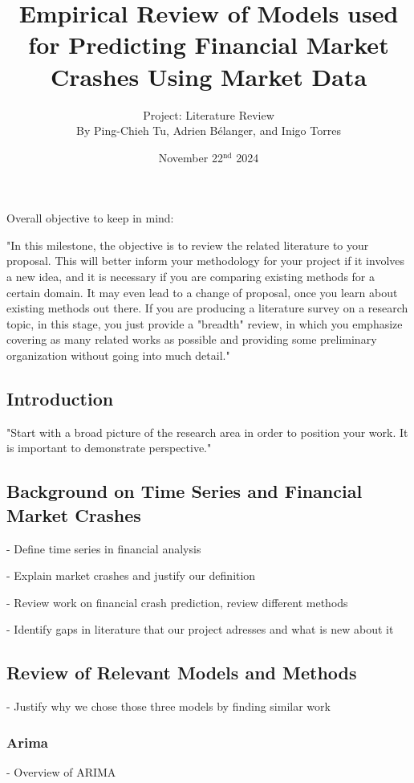\documentclass[12pt, letterpaper]{article}
\title{Empirical Review of Models used for Predicting Financial Market Crashes Using Market Data}
\author{\large Project: Literature Review \vspace{0.75em} \\ \normalsize By Ping-Chieh Tu, Adrien Bélanger, and Inigo Torres}
\date{November 22$^{\text{nd}}$ 2024}
\begin{document}
\maketitle 

\justifying %

Overall objective to keep in mind:

"In this milestone, the objective is to review the related literature to your proposal. This will better inform your methodology for your project if it involves a new idea, and it is necessary if you are comparing existing methods for a certain domain. It may even lead to a change of proposal, once you learn about existing methods out there. If you are producing a literature survey on a research topic, in this stage, you just provide a "breadth" review, in which you emphasize covering as many related works as possible and providing some preliminary organization without going into much detail."




\subsection*{Introduction}
"Start with a broad picture of the research area in order to position your work. It is important to demonstrate perspective."

\subsection*{Background on Time Series and Financial Market Crashes}

- Define time series in financial analysis

- Explain market crashes and justify our definition

- Review work on financial crash prediction, review different methods

- Identify gaps in literature that our project adresses and what is new about it

\subsection*{Review of Relevant Models and Methods}
- Justify why we chose those three models by finding similar work
    \subsubsection*{Arima}
    - Overview of ARIMA 
\end{document}
